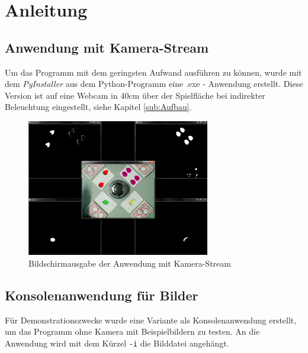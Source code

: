 
\section{Anleitung}
\label{sec:Anleitung}

\subsection{Anwendung mit Kamera-Stream}

Um das Programm mit dem geringsten Aufwand ausführen zu können, wurde mit dem \emph{PyInstaller} aus dem Python-Programm eine .exe - Anwendung erstellt. Diese Version ist auf eine Webcam in 40cm über der Spielfläche bei indirekter Beleuchtung eingestellt, siehe Kapitel \ref{sub:Aufbau}.
\begin{figure}[H]
    \centering
    \includegraphics[width=8cm]{Abbildungen/HalliGalli01}
    \caption[Aus]{Bildschirmausgabe der Anwendung mit Kamera-Stream}
    \label{fig:Ausgabe}
\end{figure}

\subsection{Konsolenanwendung für Bilder}
Für Demonstrationszwecke wurde eine Variante als Konsolenanwendung erstellt, um das Programm ohne Kamera mit Beispielbildern zu testen. 
An die Anwendung wird mit dem Kürzel \lstinline{-i} die Bilddatei angehängt.
 
